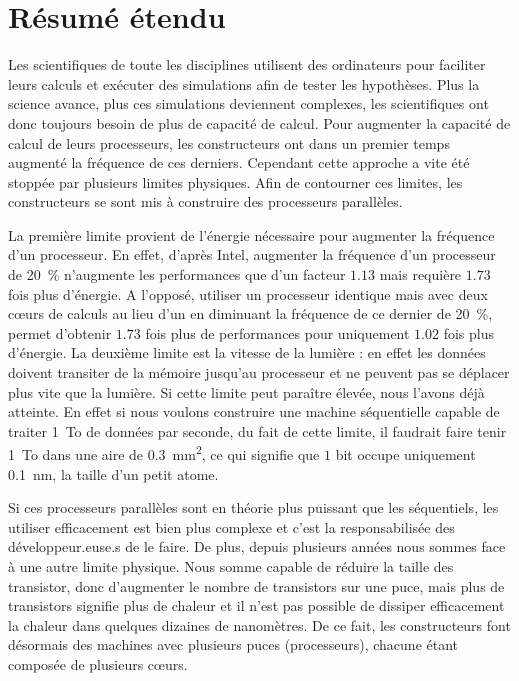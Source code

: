 \chapter{Résumé étendu}

Les scientifiques de toute les disciplines utilisent des ordinateurs pour faciliter leurs calculs et exécuter des simulations afin de tester les hypothèses.
Plus la science avance, plus ces simulations deviennent complexes, les scientifiques ont donc toujours besoin de plus de capacité de calcul.
Pour augmenter la capacité de calcul de leurs processeurs, les constructeurs ont dans un premier temps augmenté la fréquence de ces derniers.
Cependant cette approche a vite été stoppée par plusieurs limites physiques.
Afin de contourner ces limites, les constructeurs se sont mis à construire des processeurs parallèles.

La première limite provient de l'énergie nécessaire pour augmenter la fréquence d'un processeur.
En effet, d'après \gls{Intel}, augmenter la fréquence d'un processeur de \SI{20}{\%} n'augmente les performances que d'un facteur $1.13$ mais requière $1.73$ fois plus d'énergie.
A l'opposé, utiliser un processeur identique mais avec deux cœurs de calculs au lieu d'un en diminuant la fréquence de ce dernier de \SI{20}{\%}, permet d'obtenir $1.73$ fois plus de performances pour uniquement $1.02$ fois plus d'énergie.
La deuxième limite est la vitesse de la lumière : en effet les données doivent transiter de la mémoire jusqu'au processeur et ne peuvent pas se déplacer plus vite que la lumière.
Si cette limite peut paraître élevée, nous l'avons déjà atteinte.
En effet si nous voulons construire une machine séquentielle capable de traiter \SI{1}{To} de données par seconde, du fait de cette limite, il faudrait faire tenir \SI{1}{To} dans une aire de \SI{0.3}{mm^2}, ce qui signifie que $1$ bit occupe uniquement \SI{0.1}{nm}, la taille d'un petit atome.

Si ces processeurs parallèles sont en théorie plus puissant que les séquentiels, les utiliser efficacement est bien plus complexe et c'est la responsabilisée des développeur.euse.s de le faire.
De plus, depuis plusieurs années nous sommes face à une autre limite physique.
Nous somme capable de réduire la taille des transistor, donc d'augmenter le nombre de transistors sur une puce, mais plus de transistors signifie plus de chaleur et il n'est pas possible de dissiper efficacement la chaleur dans quelques dizaines de nanomètres.
De ce fait, les constructeurs font désormais des machines avec plusieurs puces (processeurs), chacune étant composée de plusieurs cœurs.

